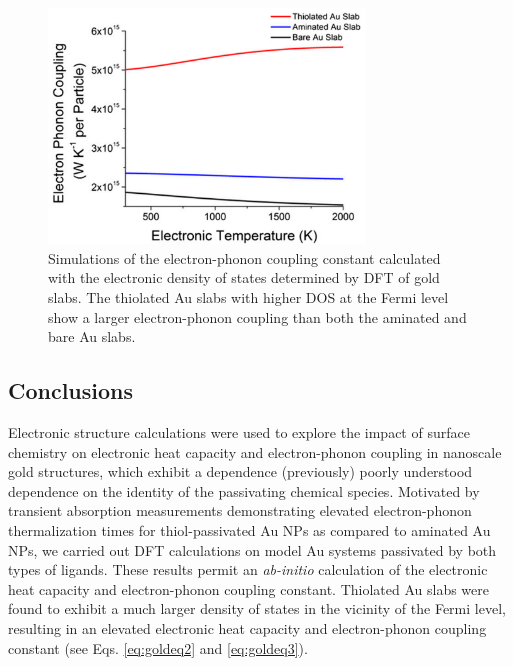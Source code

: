 \begin{figure}
\begin{center}
\includegraphics[width=0.75\textwidth]{./Chapter2/gold4.png}
\caption[Simulated electron-phonon coupling constants for thiolated and aminated Au slabs as a function of temperature.]{Simulations of the electron-phonon coupling constant calculated with the electronic density of states determined by DFT of gold slabs. The thiolated
Au slabs with higher DOS at the Fermi level show a larger electron-phonon coupling than both the aminated and bare Au slabs.}
\label{f:gold4}
\end{center}
\end{figure}

\subsection{Conclusions}
Electronic structure calculations were used to explore the impact of surface chemistry on electronic heat capacity and electron-phonon coupling in nanoscale gold structures, which exhibit a dependence (previously) poorly understood dependence on the identity of the passivating chemical species. Motivated by transient absorption measurements demonstrating elevated electron-phonon thermalization times for thiol-passivated Au NPs as compared to aminated Au NPs, we carried out DFT calculations on model Au systems passivated by both types of ligands. These results permit an \emph{ab-initio} calculation of the electronic heat capacity and electron-phonon coupling constant. Thiolated Au slabs were found to exhibit a much larger density of states in the vicinity of the Fermi level, resulting in an elevated electronic heat capacity and electron-phonon coupling constant (see Eqs. \ref{eq:goldeq2} and \ref{eq:goldeq3}).

